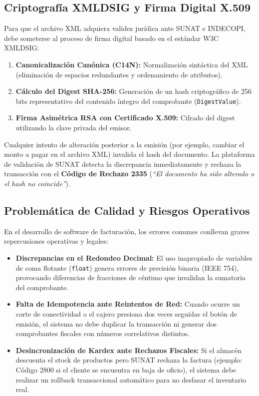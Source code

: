 \documentclass[11pt,a4paper]{article}
\begin{document}
\subsection{Criptografía XMLDSIG y Firma Digital X.509}
Para que el archivo XML adquiera validez jurídica ante SUNAT e INDECOPI, debe someterse al proceso de firma digital basado en el estándar W3C XMLDSIG:
\begin{enumerate}[noitemsep]
    \item \textbf{Canonicalización Canónica (C14N):} Normalización sintáctica del XML (eliminación de espacios redundantes y ordenamiento de atributos).
    \item \textbf{Cálculo del Digest SHA-256:} Generación de un hash criptográfico de 256 bits representativo del contenido íntegro del comprobante (\texttt{DigestValue}).
    \item \textbf{Firma Asimétrica RSA con Certificado X.509:} Cifrado del digest utilizando la clave privada del emisor.
\end{enumerate}

Cualquier intento de alteración posterior a la emisión (por ejemplo, cambiar el monto a pagar en el archivo XML) invalida el hash del documento. La plataforma de validación de SUNAT detecta la discrepancia inmediatamente y rechaza la transacción con el \textbf{Código de Rechazo 2335} (\textit{``El documento ha sido alterado o el hash no coincide''}).

\subsection{Problemática de Calidad y Riesgos Operativos}
En el desarrollo de software de facturación, los errores comunes conllevan graves repercusiones operativas y legales:
\begin{itemize}[noitemsep]
    \item \textbf{Discrepancias en el Redondeo Decimal:} El uso inapropiado de variables de coma flotante (\texttt{float}) genera errores de precisión binaria (IEEE 754), provocando diferencias de fracciones de céntimo que invalidan la sumatoria del comprobante.
    \item \textbf{Falta de Idempotencia ante Reintentos de Red:} Cuando ocurre un corte de conectividad o el cajero presiona dos veces seguidas el botón de emisión, el sistema no debe duplicar la transacción ni generar dos comprobantes fiscales con números correlativos distintos.
    \item \textbf{Desincronización de Kardex ante Rechazos Fiscales:} Si el almacén descuenta el stock de productos pero SUNAT rechaza la factura (ejemplo: Código 2800 si el cliente se encuentra en baja de oficio), el sistema debe realizar un rollback transaccional automático para no desfasar el inventario real.
\end{itemize}
\end{document}
